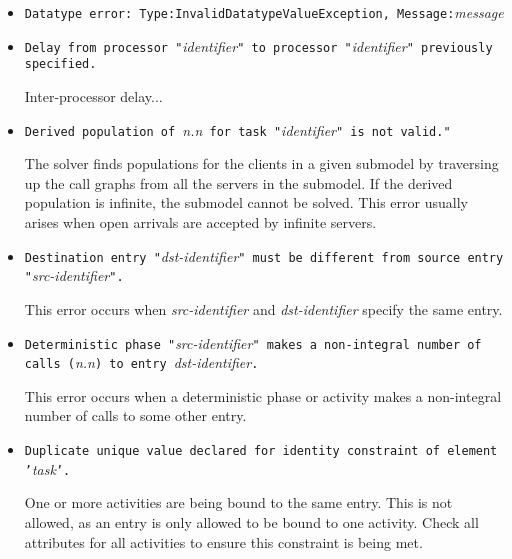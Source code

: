 \begin{itemize}
\item \texttt{Datatype error: Type:InvalidDatatypeValueException,
    Message:}\emph{message}

\item \texttt{Delay from processor "}\emph{identifier}\texttt{" to
    processor "}\emph{identifier}\texttt{" previously specified.}

  Inter-processor delay...

\item \texttt{Derived population of }\emph{n.n}\texttt{ for task
    "}\emph{identifier}\texttt{" is not valid."}
  
  The solver finds populations for the
  clients in a given submodel by
  traversing up the call graphs from all the servers in the submodel.
  If the derived population is infinite,
  the submodel cannot be solved.  This error usually arises when open
  arrivals are accepted by infinite
  servers.

\item \texttt{Destination entry "}\emph{dst-identifier}\texttt{" must
    be different from source entry "}\emph{src-identifier}\texttt{".}
  
  This error occurs when \emph{src-identifier} and
  \emph{dst-identifier} specify the same
  entry.

\item \texttt{Deterministic phase "}\emph{src-identifier}\texttt{"
    makes a non-integral number of calls (}\emph{n.n}\texttt{) to
    entry }\emph{dst-identifier}\texttt{.}
  
  This error occurs when a deterministic
  phase or activity makes a
  non-integral number of calls to some other entry.

\item \texttt{Duplicate unique value declared for identity constraint
    of element '}\emph{task}\texttt{'.}
  
  One or more activities are being bound to the same
  entry.  This is not allowed, as
  an entry is only allowed to be bound to one activity.  Check all
   attributes for all activities to ensure
  this constraint is being met.


\end{itemize}
